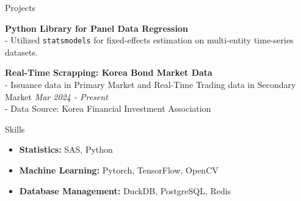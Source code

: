 \documentclass{resume} %
\begin{document}
\begin{rSection}{Projects}

{\bf Python Library for Panel Data Regression}
\\- Utilized \texttt{statsmodels} for fixed-effects estimation on multi-entity time-series datasets. 

{\bf Real-Time Scrapping: Korea Bond Market Data }
\\- Issuance data in Primary Market and Real-Time Trading data in Secondary Market \hfill {\em Mar 2024 - Present}
\\- Data Source: Korea Financial Investment Association

\end{rSection}


\begin{rSection}{Skills}
\begin{itemize}
    \item {\bf Statistics:} SAS, Python
    \item {\bf Machine Learning:} Pytorch, TensorFlow, OpenCV
    \item {\bf Database Management:} DuckDB, PostgreSQL, Redis
\end{itemize}
\end{rSection}

\end{document}
